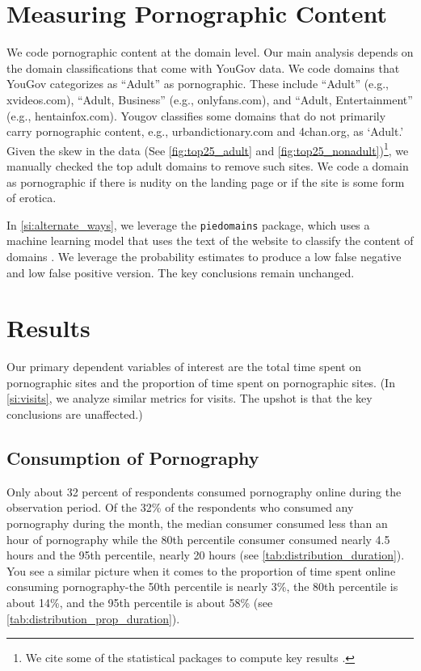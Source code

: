 \documentclass[12pt, letterpaper]{article}
\begin{document}
\section*{Measuring Pornographic Content}\label{sec:measuring_porn_content}

We code pornographic content at the domain level. Our main analysis depends on the domain classifications that come with YouGov data. We code domains that YouGov categorizes as ``Adult'' as pornographic. These include ``Adult'' (e.g., xvideos.com), ``Adult, Business'' (e.g., onlyfans.com), and ``Adult, Entertainment'' (e.g., hentainfox.com). Yougov classifies some domains that do not primarily carry pornographic content, e.g., urbandictionary.com and 4chan.org, as `Adult.' Given the skew in the data (See \cref{fig:top25_adult} and \cref{fig:top25_nonadult})\footnote{We cite some of the statistical packages to compute key results \citep{tableone, statsmodels, forestplot, scipy}.}, we manually checked the top adult domains to remove such sites. We code a domain as pornographic if there is nudity on the landing page or if the site is some form of erotica. 

In \ref{si:alternate_ways}, we leverage the \texttt{piedomains} package, which uses a machine learning model that uses the text of the website to classify the content of domains \citep{Chintalapati_piedomains_Predict_the_2022}. We leverage the probability estimates to produce a low false negative and low false positive version. The key conclusions remain unchanged.

\section*{Results}\label{sec:results}

Our primary dependent variables of interest are the total time spent on pornographic sites and the proportion of time spent on pornographic sites. (In \ref{si:visits}, we analyze similar metrics for visits. The upshot is that the key conclusions are unaffected.)

\subsection*{Consumption of Pornography}
Only about 32 percent of respondents consumed pornography online during the observation period. Of the 32\% of the respondents who consumed any pornography during the month, the median consumer consumed less than an hour of pornography while the 80th percentile consumer consumed nearly 4.5 hours and the 95th percentile, nearly 20 hours (see \cref{tab:distribution_duration}). You see a similar picture when it comes to the proportion of time spent online consuming pornography-the 50th percentile is nearly 3\%, the 80th percentile is about 14\%, and the 95th percentile is about 58\% (see \ref{tab:distribution_prop_duration}). 
\end{document}
